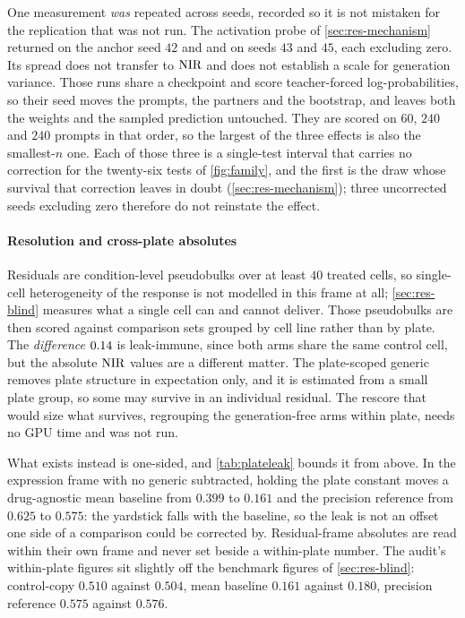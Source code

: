 One measurement \emph{was} repeated across seeds, recorded so it is not mistaken
for the replication that was not run. The activation probe of \cref{sec:res-mechanism} returned  on the anchor seed $42$ and  and  on seeds $43$ and $45$, each excluding zero. Its spread does not transfer to $\textrm{NIR}$ and does not
establish a scale for generation variance. Those runs share a checkpoint and
score teacher-forced log-probabilities, so their seed moves the prompts, the
partners and the bootstrap, and leaves both the weights and the sampled
prediction untouched. They are scored on $60$, $240$ and $240$ prompts in that order, so
the largest of the three effects is also the smallest-$n$ one. Each of those three is a single-test interval that carries no correction for the twenty-six tests of \cref{fig:family}, and the first is the draw whose survival that correction leaves in doubt (\cref{sec:res-mechanism}); three uncorrected seeds excluding zero therefore do not reinstate the effect.

\paragraph{Resolution and cross-plate absolutes} Residuals are condition-level
pseudobulks over at least $40$ treated cells, so single-cell heterogeneity of the
response is not modelled in this frame at all; \cref{sec:res-blind} measures what
a single cell can and cannot deliver. Those pseudobulks are then scored against
comparison sets grouped by cell line rather than by plate. The \emph{difference}
$0.14$ is leak-immune, since both arms share the same control cell, but the
absolute $\textrm{NIR}$ values are a different matter. The plate-scoped generic removes
plate structure in expectation only, and it is estimated from a small plate
group, so some may survive in an individual residual. The rescore that would size
what survives, regrouping the generation-free arms within plate, needs no GPU
time and was not run.

What exists instead is one-sided, and \cref{tab:plateleak} bounds it from
above. In the expression frame with no
generic subtracted, holding the plate constant moves a drug-agnostic mean
baseline from $0.399$ to $0.161$ and the precision reference from $0.625$ to
$0.575$: the yardstick falls with the baseline, so the leak is not an offset one
side of a comparison could be corrected by. Residual-frame absolutes are read
within their own frame and never set beside a within-plate number. The audit's within-plate figures sit slightly off the benchmark figures of \cref{sec:res-blind}: control-copy $0.510$ against $0.504$, mean baseline $0.161$ against $0.180$, precision reference $0.575$ against $0.576$.

